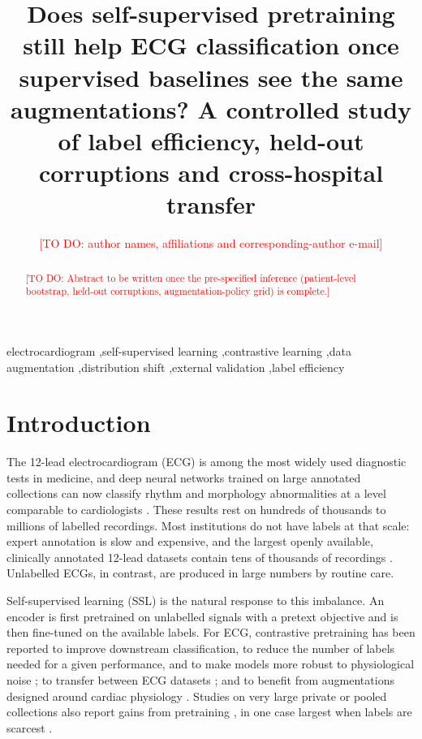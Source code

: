 \documentclass[preprint,12pt]{elsarticle}
\newcommand{\todo}[1]{\textcolor{red}{[TO DO: #1]}}
\begin{document}
\begin{frontmatter}

\title{Does self-supervised pretraining still help ECG classification once supervised baselines see the same augmentations? A controlled study of label efficiency, held-out corruptions and cross-hospital transfer}

\author{\todo{author names, affiliations and corresponding-author e-mail}}

\begin{abstract}
\todo{Abstract to be written once the pre-specified inference (patient-level bootstrap, held-out corruptions, augmentation-policy grid) is complete.}
\end{abstract}

\begin{keyword}
electrocardiogram \sep self-supervised learning \sep contrastive learning \sep data augmentation \sep distribution shift \sep external validation \sep label efficiency
\end{keyword}

\end{frontmatter}

\section{Introduction}
\label{sec:intro}

The 12-lead electrocardiogram (ECG) is among the most widely used diagnostic tests in medicine, and deep neural networks trained on large annotated collections can now classify rhythm and morphology abnormalities at a level comparable to cardiologists \cite{hannun2019,ribeiro2020}. These results rest on hundreds of thousands to millions of labelled recordings. Most institutions do not have labels at that scale: expert annotation is slow and expensive, and the largest openly available, clinically annotated 12-lead datasets contain tens of thousands of recordings \cite{wagner2020,liu2022sph,zheng2020}. Unlabelled ECGs, in contrast, are produced in large numbers by routine care.

Self-supervised learning (SSL) is the natural response to this imbalance. An encoder is first pretrained on unlabelled signals with a pretext objective and is then fine-tuned on the available labels. For ECG, contrastive pretraining has been reported to improve downstream classification, to reduce the number of labels needed for a given performance, and to make models more robust to physiological noise \cite{mehari2022}; to transfer between ECG datasets \cite{soltanieh2024ood}; and to benefit from augmentations designed around cardiac physiology \cite{gopal2021}. Studies on very large private or pooled collections also report gains from pretraining \cite{lai2023,weimann2025}, in one case largest when labels are scarcest \cite{dade2026}.
\end{document}
